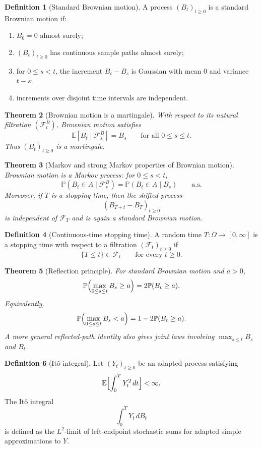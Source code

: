 \documentclass[11pt]{article}
\newtheorem{theorem}{Theorem}[section]
\theoremstyle{definition}
\newtheorem{definition}[theorem]{Definition}
\begin{document}
\begin{definition}[Standard Brownian motion]
A process $(B_t)_{t\ge 0}$ is a standard Brownian motion if:
\begin{enumerate}[label=(\roman*)]
    \item $B_0=0$ almost surely;
    \item $(B_t)_{t\ge 0}$ has continuous sample paths almost surely;
    \item for $0\le s<t$, the increment $B_t-B_s$ is Gaussian with mean $0$ and variance $t-s$;
    \item increments over disjoint time intervals are independent.
\end{enumerate}
\end{definition}

\begin{theorem}[Brownian motion is a martingale]
With respect to its natural filtration $(\mathcal F_t^B)$, Brownian motion satisfies
\[
\mathbb E[B_t\mid \mathcal F_s^B]=B_s
\qquad \text{for all } 0\le s\le t.
\]
Thus $(B_t)_{t\ge 0}$ is a martingale.
\end{theorem}

\begin{theorem}[Markov and strong Markov properties of Brownian motion]
Brownian motion is a Markov process: for $0\le s<t$,
\[
\mathbb P(B_t\in A\mid \mathcal F_s^B)=\mathbb P(B_t\in A\mid B_s)
\qquad \text{a.s.}
\]
Moreover, if $T$ is a stopping time, then the shifted process
\[
(B_{T+t}-B_T)_{t\ge 0}
\]
is independent of $\mathcal F_T$ and is again a standard Brownian motion.
\end{theorem}

\begin{definition}[Continuous-time stopping time]
A random time $T:\Omega\to[0,\infty]$ is a stopping time with respect to a filtration $(\mathcal F_t)_{t\ge 0}$ if
\[
\{T\le t\}\in \mathcal F_t
\qquad \text{for every } t\ge 0.
\]
\end{definition}

\begin{theorem}[Reflection principle]
For standard Brownian motion and $a>0$,
\[
\mathbb P\Bigl(\max_{0\le s\le t} B_s \ge a\Bigr)
=2\mathbb P(B_t\ge a).
\]
Equivalently,
\[
\mathbb P\Bigl(\max_{0\le s\le t} B_s < a\Bigr)
=1-2\mathbb P(B_t\ge a).
\]
A more general reflected-path identity also gives joint laws involving $\max_{s\le t}B_s$ and $B_t$.
\end{theorem}

\begin{definition}[It\^o integral]
Let $(Y_t)_{t\ge 0}$ be an adapted process satisfying
\[
\mathbb E\Bigl[\int_0^T Y_t^2\,dt\Bigr]<\infty.
\]
The It\^o integral
\[
\int_0^T Y_t\,dB_t
\]
is defined as the $L^2$-limit of left-endpoint stochastic sums for adapted simple approximations to $Y$.
\end{definition}
\end{document}
